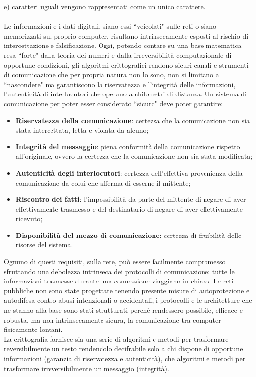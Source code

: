 \documentclass[a4paper,12pt]{tesiinfo}
\begin{document}
e) caratteri uguali vengono rappresentati come un unico carattere. 
\\
\\
Le informazioni e i dati digitali, siano essi ``veicolati" sulle reti o siano memorizzati sul proprio computer, risultano intrinsecamente esposti al rischio di intercettazione e falsificazione. Oggi, potendo contare su una base matematica resa ``forte" dalla teoria dei numeri e dalla irreversibilit\`a computazionale di opportune condizioni, gli algoritmi crittografici rendono sicuri canali e strumenti di comunicazione che per propria natura non lo sono, non si limitano a ``nascondere" ma garantiscono la riservatezza e l'integrit\`a delle informazioni, l'autenticit\`a di interlocutori che operano a chilometri di distanza. 
Un sistema di comunicazione per poter esser considerato ``sicuro" deve poter garantire:
 \begin{itemize}
   \item \textbf{Riservatezza della comunicazione}: certezza che la comunicazione non sia stata intercettata, letta e violata da alcuno;
   \item \textbf{Integrit\`a del messaggio}: piena conformit\`a della comunicazione rispetto all'originale, ovvero la certezza che la comunicazione non sia stata modificata;
   \item \textbf{Autenticit\`a degli interlocutori}: certezza dell'effettiva provenienza della comunicazione da colui che afferma di esserne il mittente;
   \item \textbf{Riscontro dei fatti}: l'impossibilit\`a da parte del mittente di negare di aver effettivamente trasmesso e del destinatario di negare di aver effettivamente ricevuto;
   \item \textbf{Disponibilit\`a del mezzo di comunicazione}: certezza di fruibilit\`a delle risorse del sistema.
 \end{itemize}
Ognuno di questi requisiti, sulla rete, pu\`o essere facilmente compromesso sfruttando una debolezza intrinseca dei protocolli di comunicazione: tutte le informazioni trasmesse durante una connessione viaggiano in chiaro. Le reti pubbliche non sono state progettate tenendo presente misure di autoprotezione e autodifesa contro abusi intenzionali o accidentali, i protocolli e le architetture che ne stanno alla base sono stati strutturati perch\`e rendessero possibile, efficace e robusta, ma non intrinsecamente sicura, la comunicazione tra computer fisicamente lontani. 
\\
La crittografia fornisce sia una serie di algoritmi e metodi per trasformare reversibilmente un testo rendendolo decifrabile solo a chi dispone di opportune informazioni (garanzia di riservatezza e autenticit\`a), che algoritmi e metodi per trasformare irreversibilmente un messaggio (integrit\`a). 
\end{document}
